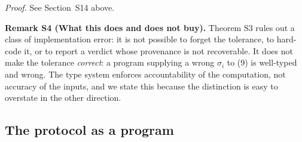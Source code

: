 \documentclass[11pt,a4paper]{article}
\theoremstyle{definition}
\theoremstyle{remark}
\begin{document}
\noindent\emph{Proof.} See Section~S14 above.

\par\noindent\textbf{Remark S4 (What this does and does not buy).}\label{rem:type-limits} 
Theorem S3 rules out a class of implementation error:
it is not possible to forget the tolerance, to hard-code it, or to
report a verdict whose provenance is not recoverable. It does not make
the tolerance \emph{correct}: a program supplying a wrong $\sigma_i$ to
(9) is well-typed and wrong. The type system enforces
accountability of the computation, not accuracy of the inputs, and we
state this because the distinction is easy to overstate in the other
direction.
\par

\subsection*{The protocol as a program}
\end{document}
